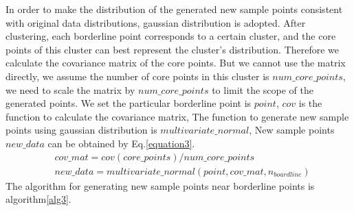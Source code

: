 \documentclass[runningheads]{llncs}
\begin{document}
In order to make the distribution of the generated new sample points 
consistent with original data distributions,
gaussian distribution is adopted.
After clustering, each borderline point corresponds to a certain cluster, 
and the core points of this cluster can best represent the cluster's distribution.
Therefore we calculate the covariance matrix of the core points. 
But we cannot use the matrix directly, we 
assume the number of core points in this cluster is $num\_core\_points$,
we need to scale the matrix by $num\_core\_points$ to limit 
the scope of the generated points.
We set the particular borderline point is $point$, 
$cov$ is the function to calculate the covariance matrix,
The function to generate new sample points using 
gaussian distribution is $multivariate\_normal$,
New sample points $new\_data$ can be obtained by Eq.\ref{equation3}.
\begin{equation}
  \label{equation3}
  \begin{aligned}
      & cov\_mat=cov(core\_points)/num\_core\_points \\
      & new\_data=multivariate\_normal(point,cov\_mat,n_{boardline})
  \end{aligned}
\end{equation}
The algorithm for generating new sample points near borderline points is algorithm\ref{alg3}.
\end{document}
